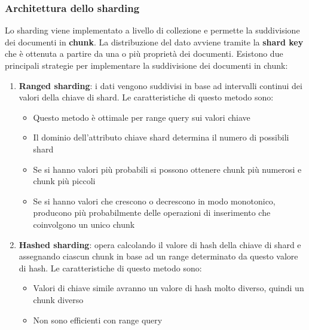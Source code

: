 \documentclass[a4paper,twoside]{article}
\begin{document}
\subsubsection{Architettura dello sharding}
Lo sharding viene implementato a livello di collezione e permette la suddivisione
dei documenti in \textbf{chunk}. La distribuzione del dato avviene tramite la
\textbf{shard key} che è ottenuta a partire da una o più proprietà dei documenti.
Esistono due principali strategie per implementare la suddivisione dei documenti
in chunk:
\begin{enumerate}
  \item \textbf{Ranged sharding}: i dati vengono suddivisi in base ad intervalli
    continui dei valori della chiave di shard. Le caratteristiche di questo metodo sono:
    \begin{itemize}
      \item Questo metodo è ottimale per range query sui valori chiave

      \item Il dominio dell'attributo chiave shard
        determina il numero di possibili shard

      \item Se si hanno valori più probabili si possono ottenere chunk più numerosi
        e chunk più piccoli

      \item Se si hanno valori che crescono o decrescono in modo monotonico, producono
        più probabilmente delle operazioni di inserimento che coinvolgono un unico
        chunk
    \end{itemize}

  \item \textbf{Hashed sharding}: opera calcolando il valore di hash della chiave
    di shard e assegnando ciascun chunk in base ad un range determinato da questo
    valore di hash. Le caratteristiche di questo metodo sono:
    \begin{itemize}
      \item Valori di chiave simile avranno un valore di hash molto diverso, quindi
        un chunk diverso

      \item Non sono efficienti con range query
    \end{itemize}
\end{enumerate}
\end{document}
